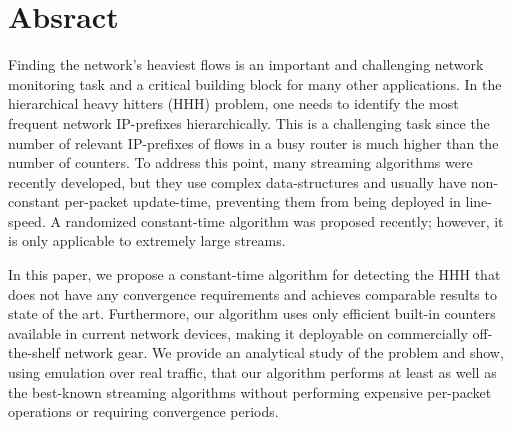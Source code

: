 \section{Absract}
Finding the network's heaviest flows is an important and challenging network monitoring task and a critical building block for many other applications.
In the hierarchical heavy hitters (HHH) problem, one needs to identify the most frequent network IP-prefixes hierarchically.
This is a challenging task since the number of relevant IP-prefixes of flows in a busy router is much higher than the number of counters.
To address this point, many streaming algorithms were recently developed, but they use complex data-structures and usually have non-constant per-packet update-time, preventing them from being deployed in line-speed.
A randomized constant-time algorithm was proposed recently; however, it is only applicable to extremely large streams.

In this paper, we propose a constant-time algorithm for detecting the HHH that does not have any convergence requirements and achieves comparable results to state of the art.
Furthermore, our algorithm uses only efficient built-in counters available in current network devices, making it deployable on commercially off-the-shelf network gear.
We provide an analytical study of the problem and show, using emulation over real traffic, that our algorithm performs at least as well as the best-known streaming algorithms without performing expensive per-packet operations or requiring convergence periods.
